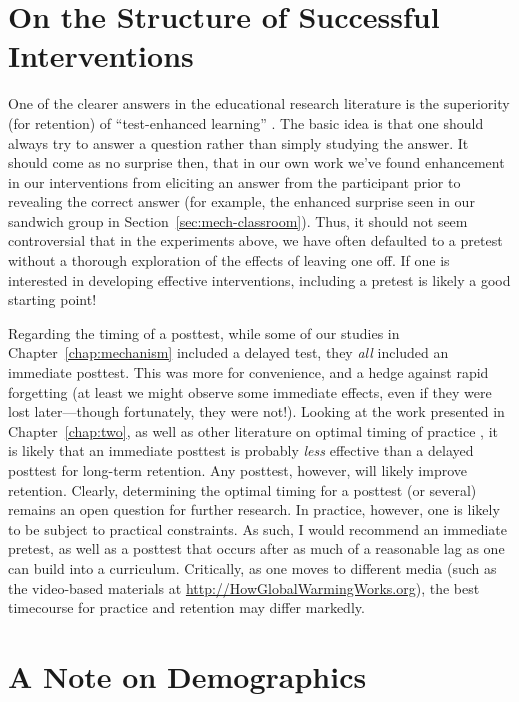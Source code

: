 \section{On the Structure of Successful Interventions}


One of the clearer answers in the educational research literature is the
superiority (for retention) of “test-enhanced learning”
\parencite{roediger_test-enhanced_2006}. The basic idea is that one should
always try to answer a question rather than simply studying the answer. It
should come as no surprise then, that in our own work we've found enhancement
in our interventions from eliciting an answer from the participant prior to
revealing the correct answer (for example, the enhanced surprise seen in our
sandwich group in Section~\ref{sec:mech-classroom}). Thus, it should not seem
controversial that in the experiments above, we have often defaulted to a
pretest without a thorough exploration of the effects of leaving one off. If one
is interested in developing effective interventions, including a pretest is
likely a good starting point!

Regarding the timing of a posttest, while some of our studies in
Chapter~\ref{chap:mechanism} included a delayed test, they \emph{all} included
an immediate posttest. This was more for convenience, and a hedge against rapid
forgetting (at least we might observe some immediate effects, even if they were
lost later---though fortunately, they were not!). Looking at the work presented
in Chapter~\ref{chap:two}, as well as other literature on optimal timing of
practice \parencite[e.g.,][]{cepeda_optimizing_2009}, it is likely that an
immediate posttest is probably \emph{less} effective than a delayed posttest for
long-term retention. Any posttest, however, will likely improve retention.
Clearly, determining the optimal timing for a posttest (or several) remains an
open question for further research. In practice, however, one is likely to be
subject to practical constraints. As such, I would recommend an immediate
pretest, as well as a posttest that occurs after as much of a reasonable lag as
one can build into a curriculum. Critically, as one moves to different media
(such as the video-based materials at \url{http://HowGlobalWarmingWorks.org}),
the best timecourse for practice and retention may differ markedly.

\section{A Note on Demographics}

